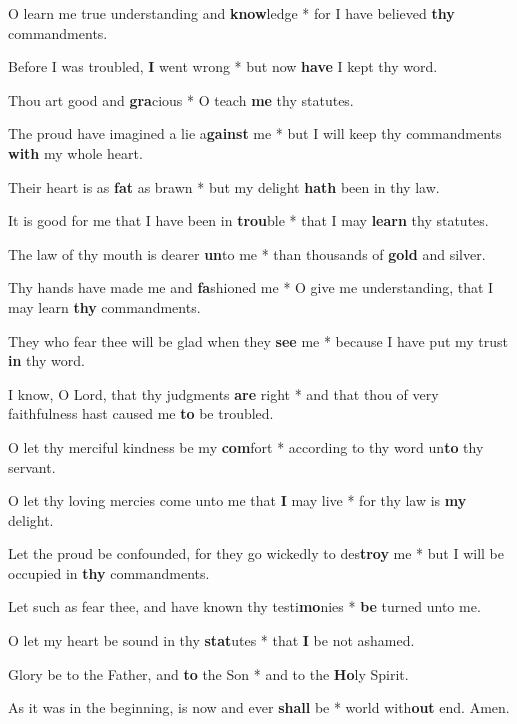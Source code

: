 \begin{multicols}{2}
	O learn me true understanding and \textbf{know}ledge * for I have believed \textbf{thy} commandments.
	
	Before I was troubled, \textbf{I} went wrong * but now \textbf{have} I kept thy word.
	
	Thou art good and \textbf{gra}cious * O teach \textbf{me} thy statutes.
	
	The proud have imagined a lie a\textbf{gainst} me * but I will keep thy commandments \textbf{with} my whole heart.
	
	Their heart is as \textbf{fat} as brawn * but my delight \textbf{hath} been in thy law.
	
	It is good for me that I have been in \textbf{trou}ble * that I may \textbf{learn} thy statutes.
	
	The law of thy mouth is dearer \textbf{un}to me * than thousands of \textbf{gold} and silver.
	
	Thy hands have made me and \textbf{fa}shioned me * O give me understanding, that I may learn \textbf{thy} commandments.
	
	They who fear thee will be glad when they \textbf{see} me * because I have put my trust \textbf{in} thy word.
	
	I know, O Lord, that thy judgments \textbf{are} right * and that thou of very faithfulness hast caused me \textbf{to} be troubled.
	
	O let thy merciful kindness be my \textbf{com}fort * according to thy word un\textbf{to} thy servant.
	
	O let thy loving mercies come unto me that \textbf{I} may live * for thy law is \textbf{my} delight.
	
	Let the proud be confounded, for they go wickedly to des\textbf{troy} me * but I will be occupied in \textbf{thy} commandments.
	
	Let such as fear thee, and have known thy testi\textbf{mo}nies * \textbf{be} turned unto me.
	
	O let my heart be sound in thy \textbf{stat}utes * that \textbf{I} be not ashamed.
	
	Glory be to the Father, and \textbf{to} the Son * and to the \textbf{Ho}ly Spirit.
	
	As it was in the beginning, is now and ever \textbf{shall} be * world with\textbf{out} end. Amen.
\end{multicols}
